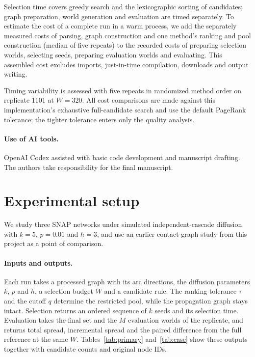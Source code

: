 \documentclass[smallextended]{svjour3}
\begin{document}
Selection time covers greedy search and the lexicographic sorting of candidates; graph preparation, world generation and evaluation are timed separately. To estimate the cost of a complete run in a warm process, we add the separately measured costs of parsing, graph construction and one method's ranking and pool construction (median of five repeats) to the recorded costs of preparing selection worlds, selecting seeds, preparing evaluation worlds and evaluating. This assembled cost excludes imports, just-in-time compilation, downloads and output writing.

Timing variability is assessed with five repeats in randomized method order on replicate 1101 at $W=320$. All cost comparisons are made against this implementation's exhaustive full-candidate search and use the default PageRank tolerance; the tighter tolerance enters only the quality analysis.

\paragraph{Use of AI tools.} OpenAI Codex assisted with basic code development and manuscript drafting. The authors take responsibility for the final manuscript.

\section{Experimental setup}\label{sec:experimental-setup}
We study three SNAP networks under simulated independent-cascade diffusion with $k=5$, $p=0.01$ and $h=3$, and use an earlier contact-graph study from this project as a point of comparison.

\paragraph{Inputs and outputs.} Each run takes a processed graph with its arc directions, the diffusion parameters $k$, $p$ and $h$, a selection budget $W$ and a candidate rule. The ranking tolerance $\tau$ and the cutoff $q$ determine the restricted pool, while the propagation graph stays intact. Selection returns an ordered sequence of $k$ seeds and its selection time. Evaluation takes the final set and the $M$ evaluation worlds of the replicate, and returns total spread, incremental spread and the paired difference from the full reference at the same $W$. Tables~\ref{tab:primary} and~\ref{tab:case} show these outputs together with candidate counts and original node IDs.
\end{document}
